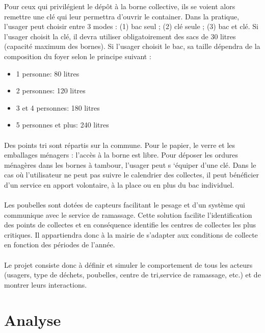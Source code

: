\documentclass[12pt]{article}
\begin{document}
Pour ceux qui privilégient le dépôt à la borne collective, ils se voient alors remettre une clé qui leur permettra d'ouvrir le container. Dans la pratique, l’usager peut choisir entre 3 modes : (1) bac seul ; (2) clé seule ; (3) bac et clé. Si l’usager choisit la clé, il devra utiliser obligatoirement des sacs de 30 litres (capacité maximum des bornes). Si l’usager choisit le bac, sa taille dépendra de la composition du foyer selon le principe suivant :
\begin{itemize}
\item 1 personne: 80 litres
\item 2 personnes: 120 litres
\item 3 et 4 personnes: 180 litres
\item 5 personnes et plus: 240 litres
\end{itemize}

\paragraph{}Des points tri sont répartis sur la commune. Pour le papier, le verre et les emballages ménagers : l’accès à la borne est libre. Pour déposer les ordures ménagères dans les bornes à tambour, l’usager peut s ‘équiper d’une clé. Dans le cas où l’utilisateur ne peut pas suivre le calendrier des collectes, il peut bénéficier d’un service en apport volontaire, à la place ou en plus du bac individuel.
\paragraph{}Les poubelles sont dotées de capteurs facilitant le pesage et d’un système qui communique avec le service de ramassage. Cette solution facilite l’identification des points de collectes et en conséquence identifie les centres de collectes les plus critiques. Il appartiendra donc à la mairie de s’adapter aux conditions de collecte en fonction des périodes de l’année.
\paragraph{}Le projet consiste donc à définir et simuler le comportement de tous les acteurs (usagers, type de déchets, poubelles, centre de tri,service de ramassage, etc.) et de montrer leurs interactions.

\section{Analyse}
\end{document}
